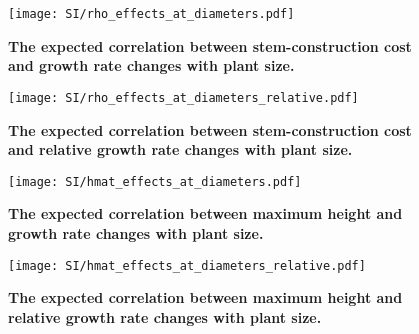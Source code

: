 \documentclass[10pt,twoside]{article}\usepackage[]{graphicx}\usepackage[]{color}
\begin{document}
\begin{figure}[ht]
\centering
\texttt{[image: SI/rho\_effects\_at\_diameters.pdf]}
\caption{\textbf{The expected correlation between stem-construction cost
and growth rate changes with plant size.} \label{f-rho_growth_size}}
\end{figure}

\begin{figure}[ht]
\centering
\texttt{[image: SI/rho\_effects\_at\_diameters\_relative.pdf]}
\caption{\textbf{The expected correlation between stem-construction cost
and relative growth rate changes with plant size.}
\label{f-rho_growth_size_relative}}
\end{figure}

\begin{figure}[ht]
\centering
\texttt{[image: SI/hmat\_effects\_at\_diameters.pdf]}
\caption{\textbf{The expected correlation between maximum height and
growth rate changes with plant size.} \label{f-hmat_growth_size}}
\end{figure}

\begin{figure}[ht]
\centering
\texttt{[image: SI/hmat\_effects\_at\_diameters\_relative.pdf]}
\caption{\textbf{The expected correlation between maximum height and
relative growth rate changes with plant size.}
\label{f-hmat_growth_size_relative}}
\end{figure}




\clearpage


\end{document}
